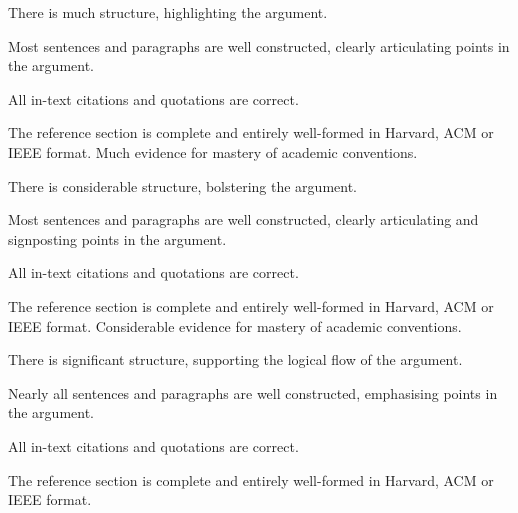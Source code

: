 \documentclass{../../fal_assignment}
\begin{document}
\begin{markingrubric}
            \par There is much structure, highlighting the argument.
            \par Most sentences and paragraphs are well constructed, clearly articulating points in the argument.
        \par All in-text citations and quotations are correct.
        \par The reference section is complete and entirely well-formed in Harvard, ACM or IEEE format.
        \grade 	Much evidence for mastery of academic conventions.
            \par There is considerable structure, bolstering the argument.
            \par Most sentences and paragraphs are well constructed, clearly articulating and signposting points in the argument.
        \par All in-text citations and quotations are correct.
        \par The reference section is complete and entirely well-formed in Harvard, ACM or IEEE format.
        \grade 	Considerable evidence for mastery of academic conventions.
            \par There is significant structure, supporting the logical flow of the argument.
            \par Nearly all sentences and paragraphs are well constructed, emphasising points in the argument.
        \par All in-text citations and quotations are correct.
        \par The reference section is complete and entirely well-formed in Harvard, ACM or IEEE format.
\end{markingrubric}
\end{document}
